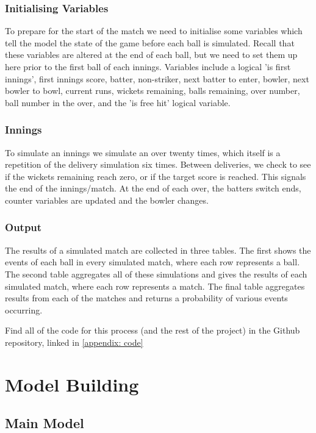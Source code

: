 \subsubsection{Initialising Variables}

To prepare for the start of the match we need to initialise some variables which tell the model the state of the game before each ball is simulated. Recall that these variables are altered at the end of each ball, but we need to set them up here prior to the first ball of each innings. Variables include a logical 'is first innings', first innings score, batter, non-striker, next batter to enter, bowler, next bowler to bowl, current runs, wickets remaining, balls remaining, over number, ball number in the over, and the 'is free hit' logical variable.

\subsubsection{Innings}

To simulate an innings we simulate an over twenty times, which itself is a repetition of the delivery simulation six times. Between deliveries, we check to see if the wickets remaining reach zero, or if the target score is reached. This signals the end of the innings/match. At the end of each over, the batters switch ends, counter variables are updated and the bowler changes.

\subsubsection{Output}

The results of a simulated match are collected in three tables. The first shows the events of each ball in every simulated match, where each row represents a ball. The second table aggregates all of these simulations and gives the results of each simulated match, where each row represents a match. The final table aggregates results from each of the matches and returns a probability of various events occurring.

Find all of the code for this process (and the rest of the project) in the Github repository, linked in \cref{appendix: code}

\newpage
\section{Model Building}
\label{sec: models}

\subsection{Main Model}

